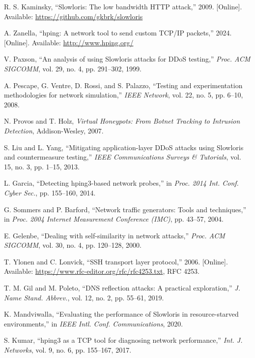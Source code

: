 \documentclass[conference]{IEEEtran}
\begin{document}
\begin{thebibliography}{99}

R. S. Kaminsky, ``Slowloris: The low bandwidth HTTP attack,'' 2009. [Online]. Available: \url{https://github.com/gkbrk/slowloris}

A. Zanella, ``hping: A network tool to send custom TCP/IP packets,'' 2024. [Online]. Available: \url{http://www.hping.org/}

V. Paxson, ``An analysis of using Slowloris attacks for DDoS testing,'' \textit{Proc. ACM SIGCOMM}, vol. 29, no. 4, pp. 291--302, 1999.

A. Pescape, G. Ventre, D. Rossi, and S. Palazzo, ``Testing and experimentation methodologies for network simulation,'' \textit{IEEE Network}, vol. 22, no. 5, pp. 6--10, 2008.

N. Provos and T. Holz, \textit{Virtual Honeypots: From Botnet Tracking to Intrusion Detection}, Addison-Wesley, 2007.

S. Liu and L. Yang, ``Mitigating application-layer DDoS attacks using Slowloris and countermeasure testing,'' \textit{IEEE Communications Surveys \& Tutorials}, vol. 15, no. 3, pp. 1--15, 2013.

L. Garcia, ``Detecting hping3-based network probes,'' in \textit{Proc. 2014 Int. Conf. Cyber Sec.}, pp. 155--160, 2014.

G. Sommers and P. Barford, ``Network traffic generators: Tools and techniques,'' in \textit{Proc. 2004 Internet Measurement Conference (IMC)}, pp. 43--57, 2004.

E. Gelenbe, ``Dealing with self-similarity in network attacks,'' \textit{Proc. ACM SIGCOMM}, vol. 30, no. 4, pp. 120--128, 2000.

T. Ylonen and C. Lonvick, ``SSH transport layer protocol,'' 2006. [Online]. Available: \url{https://www.rfc-editor.org/rfc/rfc4253.txt}, RFC 4253.

T. M. Gil and M. Poleto, ``DNS reflection attacks: A practical exploration,'' \textit{J. Name Stand. Abbrev.}, vol. 12, no. 2, pp. 55--61, 2019.

K. Mandviwalla, ``Evaluating the performance of Slowloris in resource-starved environments,'' in \textit{IEEE Intl. Conf. Communications}, 2020.

S. Kumar, ``hping3 as a TCP tool for diagnosing network performance,'' \textit{Int. J. Networks}, vol. 9, no. 6, pp. 155--167, 2017.


\end{thebibliography}
\end{document}

